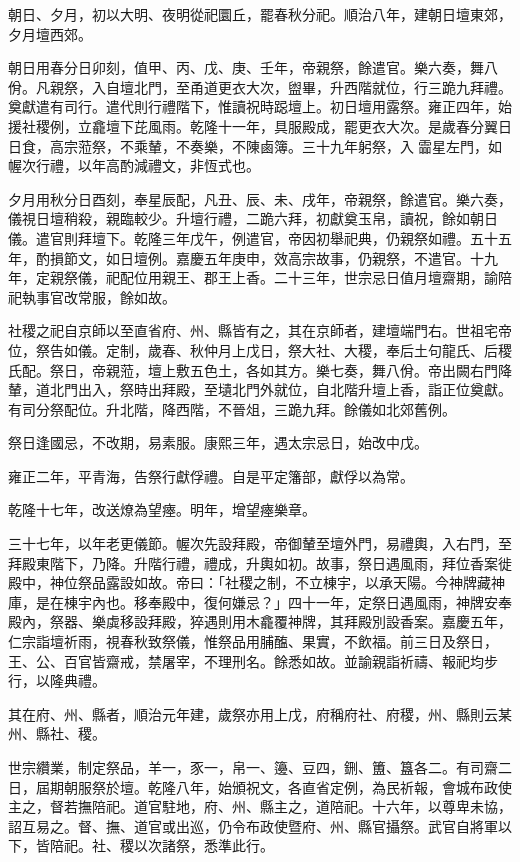 \begin{pinyinscope}
朝日、夕月，初以大明、夜明從祀圜丘，罷春秋分祀。順治八年，建朝日壇東郊，夕月壇西郊。

朝日用春分日卯刻，值甲、丙、戊、庚、壬年，帝親祭，餘遣官。樂六奏，舞八佾。凡親祭，入自壇北門，至甬道更衣大次，盥畢，升西階就位，行三跪九拜禮。奠獻遣有司行。遣代則行禮階下，惟讀祝時跽壇上。初日壇用露祭。雍正四年，始援社稷例，立龕壇下芘風雨。乾隆十一年，具服殿成，罷更衣大次。是歲春分翼日日食，高宗蒞祭，不乘輦，不奏樂，不陳鹵簿。三十九年躬祭，入霝星左門，如幄次行禮，以年高酌減禮文，非恆式也。

夕月用秋分日酉刻，奉星辰配，凡丑、辰、未、戌年，帝親祭，餘遣官。樂六奏，儀視日壇稍殺，親臨較少。升壇行禮，二跪六拜，初獻奠玉帛，讀祝，餘如朝日儀。遣官則拜壇下。乾隆三年戊午，例遣官，帝因初舉祀典，仍親祭如禮。五十五年，酌損節文，如日壇例。嘉慶五年庚申，效高宗故事，仍親祭，不遣官。十九年，定親祭儀，祀配位用親王、郡王上香。二十三年，世宗忌日值月壇齋期，諭陪祀執事官改常服，餘如故。

社稷之祀自京師以至直省府、州、縣皆有之，其在京師者，建壇端門右。世祖宅帝位，祭告如儀。定制，歲春、秋仲月上戊日，祭大社、大稷，奉后土句龍氏、后稷氏配。祭日，帝親蒞，壇上敷五色土，各如其方。樂七奏，舞八佾。帝出闕右門降輦，道北門出入，祭時出拜殿，至壝北門外就位，自北階升壇上香，詣正位奠獻。有司分祭配位。升北階，降西階，不晉俎，三跪九拜。餘儀如北郊舊例。

祭日逢國忌，不改期，易素服。康熙三年，遇太宗忌日，始改中戊。

雍正二年，平青海，告祭行獻俘禮。自是平定籓部，獻俘以為常。

乾隆十七年，改送燎為望瘞。明年，增望瘞樂章。

三十七年，以年老更儀節。幄次先設拜殿，帝御輦至壇外門，易禮輿，入右門，至拜殿東階下，乃降。升階行禮，禮成，升輿如初。故事，祭日遇風雨，拜位香案徙殿中，神位祭品露設如故。帝曰：「社稷之制，不立棟宇，以承天陽。今神牌藏神庫，是在棟宇內也。移奉殿中，復何嫌忌？」四十一年，定祭日遇風雨，神牌安奉殿內，祭器、樂虡移設拜殿，猝遇則用木龕覆神牌，其拜殿別設香案。嘉慶五年，仁宗詣壇祈雨，視春秋致祭儀，惟祭品用脯醢、果實，不飲福。前三日及祭日，王、公、百官皆齋戒，禁屠宰，不理刑名。餘悉如故。並諭親詣祈禱、報祀均步行，以隆典禮。

其在府、州、縣者，順治元年建，歲祭亦用上戊，府稱府社、府稷，州、縣則云某州、縣社、稷。

世宗纘業，制定祭品，羊一，豕一，帛一、籩、豆四，鉶、簠、簋各二。有司齋二日，屆期朝服祭於壇。乾隆八年，始頒祝文，各直省定例，為民祈報，會城布政使主之，督若撫陪祀。道官駐地，府、州、縣主之，道陪祀。十六年，以尊卑未協，詔互易之。督、撫、道官或出巡，仍令布政使暨府、州、縣官攝祭。武官自將軍以下，皆陪祀。社、稷以次諸祭，悉準此行。


\end{pinyinscope}
